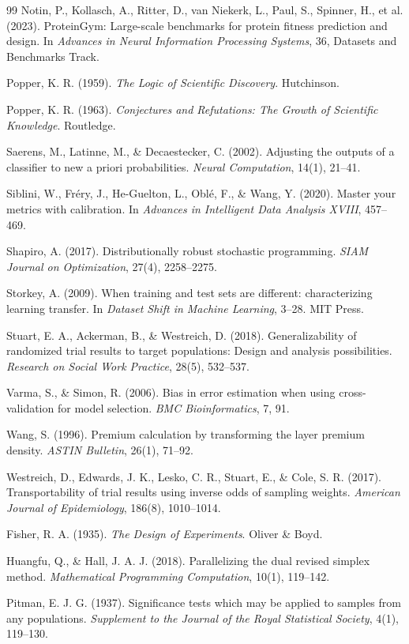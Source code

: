 \documentclass[11pt]{article}
\theoremstyle{remark}
\begin{document}
\begin{thebibliography}{99}
Notin, P., Kollasch, A., Ritter, D., van Niekerk, L., Paul, S., Spinner, H., et al. (2023).
ProteinGym: Large-scale benchmarks for protein fitness prediction and design.
In \emph{Advances in Neural Information Processing Systems}, 36, Datasets and Benchmarks Track.

Popper, K. R. (1959).
\emph{The Logic of Scientific Discovery}.
Hutchinson.

Popper, K. R. (1963).
\emph{Conjectures and Refutations: The Growth of Scientific Knowledge}.
Routledge.

Saerens, M., Latinne, M., \& Decaestecker, C. (2002).
Adjusting the outputs of a classifier to new a priori probabilities.
\emph{Neural Computation}, 14(1), 21--41.

Siblini, W., Fr\'ery, J., He-Guelton, L., Obl\'e, F., \& Wang, Y. (2020).
Master your metrics with calibration.
In \emph{Advances in Intelligent Data Analysis XVIII}, 457--469.

Shapiro, A. (2017).
Distributionally robust stochastic programming.
\emph{SIAM Journal on Optimization}, 27(4), 2258--2275.

Storkey, A. (2009).
When training and test sets are different: characterizing learning transfer.
In \emph{Dataset Shift in Machine Learning}, 3--28. MIT Press.

Stuart, E. A., Ackerman, B., \& Westreich, D. (2018).
Generalizability of randomized trial results to target populations: Design and
analysis possibilities.
\emph{Research on Social Work Practice}, 28(5), 532--537.

Varma, S., \& Simon, R. (2006).
Bias in error estimation when using cross-validation for model selection.
\emph{BMC Bioinformatics}, 7, 91.

Wang, S. (1996).
Premium calculation by transforming the layer premium density.
\emph{ASTIN Bulletin}, 26(1), 71--92.

Westreich, D., Edwards, J. K., Lesko, C. R., Stuart, E., \& Cole, S. R. (2017).
Transportability of trial results using inverse odds of sampling weights.
\emph{American Journal of Epidemiology}, 186(8), 1010--1014.

Fisher, R. A. (1935).
\emph{The Design of Experiments}.
Oliver \& Boyd.

Huangfu, Q., \& Hall, J. A. J. (2018).
Parallelizing the dual revised simplex method.
\emph{Mathematical Programming Computation}, 10(1), 119--142.

Pitman, E. J. G. (1937).
Significance tests which may be applied to samples from any populations.
\emph{Supplement to the Journal of the Royal Statistical Society}, 4(1), 119--130.

\end{thebibliography}
\end{document}
